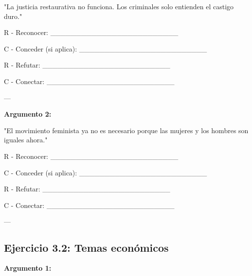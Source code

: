 \documentclass[a4paper,11pt]{article}
\begin{document}
"La justicia restaurativa no funciona. Los criminales solo entienden el castigo duro."

\vspace{0.2cm}

R - Reconocer: _________________________

\vspace{0.2cm}

C - Conceder (si aplica): _________________________

\vspace{0.2cm}

R - Refutar: _________________________

\vspace{0.2cm}

C - Conectar: _________________________

\vspace{0.2cm}

---

\vspace{0.2cm}

\textbf{Argumento 2:}

"El movimiento feminista ya no es necesario porque las mujeres y los hombres son iguales ahora."

\vspace{0.2cm}

R - Reconocer: _________________________

\vspace{0.2cm}

C - Conceder (si aplica): _________________________

\vspace{0.2cm}

R - Refutar: _________________________

\vspace{0.2cm}

C - Conectar: _________________________

\vspace{0.2cm}

---

\vspace{0.2cm}

\subsection{Ejercicio 3.2: Temas económicos}

\vspace{0.2cm}

\textbf{Argumento 1:}
\end{document}
